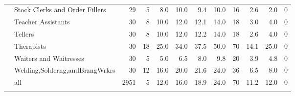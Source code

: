 {\begin{longtable}{llrrrrrrrrrr}
   & Stock Clerks and Order Fillers &   29 &  5 &  8.0 & 10.0 &  9.4 & 10.0 & 16 &  2.6 &  2.0 & 0 \\ 
   & Teacher Assistants &   30 &  8 & 10.0 & 12.0 & 12.1 & 14.0 & 18 &  3.0 &  4.0 & 0 \\ 
   & Tellers &   30 &  8 & 10.0 & 12.0 & 12.2 & 14.0 & 18 &  2.6 &  4.0 & 0 \\ 
   & Therapists &   30 & 18 & 25.0 & 34.0 & 37.5 & 50.0 & 70 & 14.1 & 25.0 & 0 \\ 
   & Waiters and Waitresses &   30 &  5 &  5.0 &  6.5 &  8.0 &  9.8 & 20 &  3.9 &  4.8 & 0 \\ 
   & Welding,Solderng,andBrzngWrkrs &   30 & 12 & 16.0 & 20.0 & 21.6 & 24.0 & 36 &  6.5 &  8.0 & 0 \\ 
   \hline
 & all & 2951 &  5 & 12.0 & 16.0 & 18.9 & 24.0 & 70 & 11.2 & 12.0 & 0 \\ 
   \hline
\hline
\caption{} 
\label{}
\end{longtable}
}
